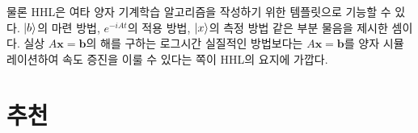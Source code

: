 \documentclass[a4paper,atbegshi,chapter,itemph,hidelinks,14pt]{oblivoir}
\begin{document}
물론 HHL은 여타 양자 기계학습 알고리즘을 작성하기 위한 템플릿으로 기능할 수 있다.
$\ket{b}$의 마련 방법, $e^{-iAt}$의 적용 방법, $\ket{x}$의 측정 방법 같은 부분
물음을 제시한 셈이다. 실상 $A\pmb{x}=\pmb{b}$의 해를 구하는 로그시간 실질적인
방법보다는 $A\pmb{x}= \pmb{b}$를 양자 시뮬레이션하여 속도 증진을 이룰 수 있다는
쪽이 HHL의 요지에 가깝다. 
\chapter{추천}
\end{document}
